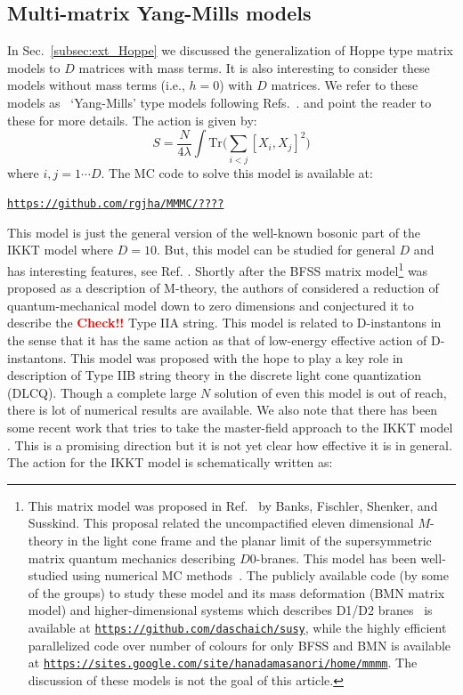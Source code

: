 \documentclass[letter,11pt]{article}
\newcommand{\TODO}[1]{\textcolor{red}{{\bf #1}}}
\begin{document}
\subsection{Multi-matrix Yang-Mills models}
In Sec.~\ref{subsec:ext_Hoppe} we discussed the generalization of Hoppe type matrix models to $D$ matrices
with mass terms. It is also interesting to consider these models without mass terms (i.e., $h=0$) with $D$ matrices. 
We refer to these models as ~`Yang-Mills' type models following Refs.~\cite{Krauth:1998yu,Krauth:1999qw}. 
and point the reader to these for more details. The action is given by: 
\begin{equation}
	\label{eq:CTmodel} 
S = \frac{N}{4\lambda} \int \mbox{Tr} \Bigg( \sum_{i < j}[X_i, X_j]^{2}\Bigg) 
\end{equation}
where $i, j = 1 \cdots D$. The MC code to solve this model is available at:
\begin{center} \texttt{\href{https://github.com/rgjha/MMMC/____}{https://github.com/rgjha/MMMC/????}} \end{center}
This model is just the general version of the well-known bosonic part of the IKKT model
where $D=10$. But, this model can be studied for general $D$ and has interesting features, see Ref. \cite{Hotta:1998en}. 
Shortly after the BFSS matrix model\footnote{This matrix model was proposed in Ref.~\cite{Banks:1996vh} by
Banks, Fischler, Shenker, and Susskind. This proposal related the 
uncompactified eleven dimensional $M$-theory in the light cone frame and the 
planar limit of the supersymmetric matrix quantum mechanics describing $D0$-branes. This model has been
well-studied using numerical MC methods~\cite{Catterall:2007fp,Hanada:2008ez,Filev:2015hia,Berkowitz:2016tyy}. 
The publicly available code (by some of the groups) to study these model and its mass deformation (BMN matrix model) and higher-dimensional systems which describes D1/D2 branes~\cite{Catterall:2017lub,Jha:2017zad,Catterall:2020nmn}
is available at \texttt{\href{https://github.com/daschaich/susy}{https://github.com/daschaich/susy}}, while the
highly efficient parallelized code over number of colours for only BFSS and BMN is available at
\texttt{\href{https://sites.google.com/site/hanadamasanori/home/mmmm}
{https://sites.google.com/site/hanadamasanori/home/mmmm}}.
The discussion of these models is not the goal of this article. 
}
was proposed as a description of M-theory, the authors of 
\cite{Ishibashi:1996xs} considered a reduction of quantum-mechanical model down to zero 
dimensions and conjectured it to describe the \TODO{Check!!} Type IIA string. This model is related to D-instantons in the sense that it has the same action as that of low-energy effective action of D-instantons. This model was proposed with the hope to play a key role in description of Type IIB string theory in the discrete light cone quantization (DLCQ). Though a complete large $N$ solution of even this model is out of reach, there is lot of numerical results are available. 
We also note that there has been some recent work that tries to take the master-field approach to the
IKKT model \cite{Klinkhamer:2021wrv}. This is a promising direction but it is not yet clear how effective 
it is in general. The action for the IKKT model is schematically written as:
\end{document}
